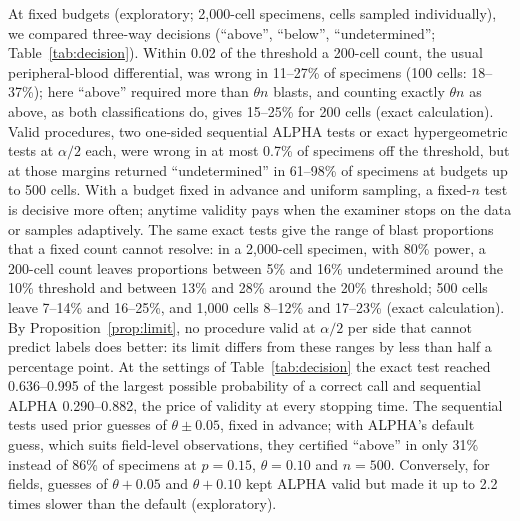 \documentclass[journal]{IEEEtran}
\begin{document}
At fixed budgets (exploratory; 2,000-cell specimens, cells sampled individually), we compared three-way decisions (``above'', ``below'', ``undetermined''; Table~\ref{tab:decision}). Within 0.02 of the threshold a 200-cell count, the usual peripheral-blood differential, was wrong in 11--27\% of specimens (100 cells: 18--37\%); here ``above'' required more than $\theta n$ blasts, and counting exactly $\theta n$ as above, as both classifications do, gives 15--25\% for 200 cells (exact calculation). Valid procedures, two one-sided sequential ALPHA tests or exact hypergeometric tests at $\alpha/2$ each, were wrong in at most 0.7\% of specimens off the threshold, but at those margins returned ``undetermined'' in 61--98\% of specimens at budgets up to 500 cells. With a budget fixed in advance and uniform sampling, a fixed-$n$ test is decisive more often; anytime validity pays when the examiner stops on the data or samples adaptively. The same exact tests give the range of blast proportions that a fixed count cannot resolve: in a 2,000-cell specimen, with 80\% power, a 200-cell count leaves proportions between 5\% and 16\% undetermined around the 10\% threshold and between 13\% and 28\% around the 20\% threshold; 500 cells leave 7--14\% and 16--25\%, and 1,000 cells 8--12\% and 17--23\% (exact calculation). By Proposition~\ref{prop:limit}, no procedure valid at $\alpha/2$ per side that cannot predict labels does better: its limit differs from these ranges by less than half a percentage point. At the settings of Table~\ref{tab:decision} the exact test reached 0.636--0.995 of the largest possible probability of a correct call and sequential ALPHA 0.290--0.882, the price of validity at every stopping time. The sequential tests used prior guesses of $\theta\pm0.05$, fixed in advance; with ALPHA's default guess, which suits field-level observations, they certified ``above'' in only 31\% instead of 86\% of specimens at $p=0.15$, $\theta=0.10$ and $n=500$. Conversely, for fields, guesses of $\theta+0.05$ and $\theta+0.10$ kept ALPHA valid but made it up to 2.2 times slower than the default (exploratory).
\end{document}
